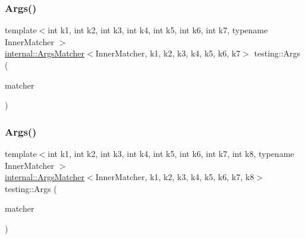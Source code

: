 \mbox{\label{namespacetesting_a9a9ef7a866b397430527076e342817f9}} 
\subsubsection{\texorpdfstring{Args()}{Args()}\hspace{0.1cm}{\footnotesize\ttfamily [8/11]}}
{\footnotesize\ttfamily template$<$int k1, int k2, int k3, int k4, int k5, int k6, int k7, typename Inner\+Matcher $>$ \\
\hyperlink{classtesting_1_1internal_1_1_args_matcher}{internal\+::\+Args\+Matcher}$<$Inner\+Matcher, k1, k2, k3, k4, k5, k6, k7$>$ testing\+::\+Args (\begin{DoxyParamCaption}\item[{const Inner\+Matcher \&}]{matcher }\end{DoxyParamCaption})\hspace{0.3cm}{\ttfamily [inline]}}

\mbox{\label{namespacetesting_ae8a4e8e1b8eb87c9f1e5f02519da7fce}} 
\subsubsection{\texorpdfstring{Args()}{Args()}\hspace{0.1cm}{\footnotesize\ttfamily [9/11]}}
{\footnotesize\ttfamily template$<$int k1, int k2, int k3, int k4, int k5, int k6, int k7, int k8, typename Inner\+Matcher $>$ \\
\hyperlink{classtesting_1_1internal_1_1_args_matcher}{internal\+::\+Args\+Matcher}$<$Inner\+Matcher, k1, k2, k3, k4, k5, k6, k7, k8$>$ testing\+::\+Args (\begin{DoxyParamCaption}\item[{const Inner\+Matcher \&}]{matcher }\end{DoxyParamCaption})\hspace{0.3cm}{\ttfamily [inline]}}

\mbox{\label{namespacetesting_a62c877e01fb9098cd3c399f921bf4e3e}} 
